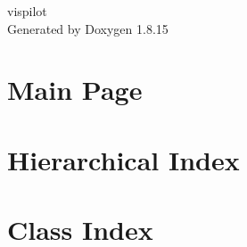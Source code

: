\let\mypdfximage\pdfximage\def\pdfximage{\immediate\mypdfximage}\documentclass[twoside]{book}
\newcommand{\+}{\discretionary{\mbox{\scriptsize$\hookleftarrow$}}{}{}}
\newcommand{\clearemptydoublepage}{%
  \newpage{\pagestyle{empty}\cleardoublepage}%
}
\begin{document}
\hypersetup{pageanchor=false,
             bookmarksnumbered=true,
             pdfencoding=unicode
            }
\begin{titlepage}
\vspace*{7cm}
\begin{center}%
{\Large vispilot }\\
\vspace*{1cm}
{\large Generated by Doxygen 1.8.15}\\
\end{center}
\end{titlepage}
\clearemptydoublepage
{}
\tableofcontents
\clearemptydoublepage
{}
\hypersetup{pageanchor=true}

\chapter{Main Page}
\label{index}\hypertarget{index}{}
\chapter{Hierarchical Index}

\chapter{Class Index}

\end{document}
